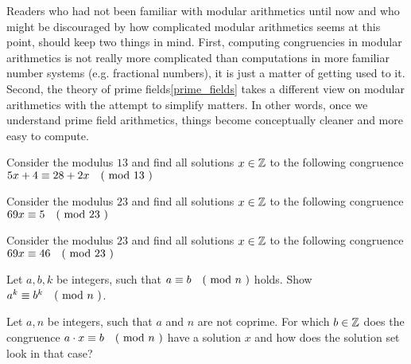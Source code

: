 Readers who had not been familiar with modular arithmetics until now and who might be discouraged by how complicated modular arithmetics seems at this point, should keep two things in mind. First, computing congruencies in modular arithmetics is not really more complicated than computations in more familiar number systems (e.g. fractional numbers), it is just a matter of getting used to it. Second, the theory of prime fields\ref{prime_fields} takes a different view on modular arithmetics with the attempt to simplify matters. In other words, once we understand prime field arithmetics, things become conceptually cleaner and more easy to compute.
\begin{exercise}
\label{exercise_congruence_in_F13}
Consider the modulus $13$ and find all solutions $x\in \mathbb{Z}$ to the following congruence $5x+4 \equiv 28+2x \quad \text{( mod } 13 \text{ )}$
\end{exercise}
\begin{exercise}Consider the modulus $23$ and find all solutions $x\in \mathbb{Z}$ to the following congruence $69x \equiv 5 \quad \text{( mod } 23 \text{ )}$
\end{exercise}
\begin{exercise}Consider the modulus $23$ and find all solutions $x\in \mathbb{Z}$ to the following congruence $69x \equiv 46 \quad \text{( mod } 23 \text{ )}$
\end{exercise}
\begin{exercise}
Let $a,b,k$ be integers, such that $a \equiv b \quad \text{( mod } n \text{ )}$ holds. Show $a^k \equiv b^k \quad \text{( mod } n \text{ )}$.
\end{exercise}
\begin{exercise}
Let $a,n$ be integers, such that $a$ and $n$ are not coprime. For which $b\in\mathbb{Z}$ does the congruence $a\cdot x \equiv b \quad \text{( mod } n \text{ )}$ have a solution $x$ and how does the solution set look in that case?
\end{exercise}
